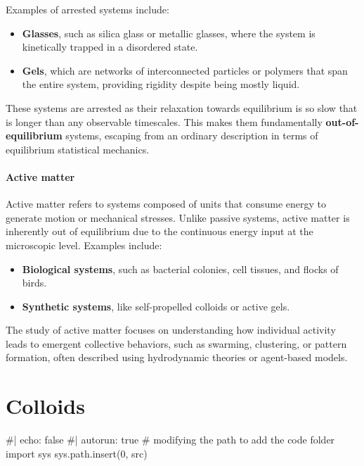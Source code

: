 \documentclass[
  letterpaper,
  enabledeprecatedfontcommands]{report}
\newenvironment{Shaded}{\begin{snugshade}}{\end{snugshade}}
\newcommand{\NormalTok}[1]{\textcolor[rgb]{0.00,0.23,0.31}{#1}}
\providecommand{\tightlist}{%
  \setlength{\itemsep}{0pt}\setlength{\parskip}{0pt}}
\begin{document}
Examples of arrested systems include:

\begin{itemize}
\tightlist
\item
  \textbf{Glasses}, such as silica glass or metallic glasses, where the
  system is kinetically trapped in a disordered state.
\item
  \textbf{Gels}, which are networks of interconnected particles or
  polymers that span the entire system, providing rigidity despite being
  mostly liquid.
\end{itemize}

These systems are arrested as their relaxation towards equilibrium is so
slow that is longer than any observable timescales. This makes them
fundamentally \textbf{out-of-equilibrium} systems, escaping from an
ordinary description in terms of equilibrium statistical mechanics.

\subsubsection*{Active matter}\label{active-matter}

Active matter refers to systems composed of units that consume energy to
generate motion or mechanical stresses. Unlike passive systems, active
matter is inherently out of equilibrium due to the continuous energy
input at the microscopic level. Examples include:

\begin{itemize}
\tightlist
\item
  \textbf{Biological systems}, such as bacterial colonies, cell tissues,
  and flocks of birds.
\item
  \textbf{Synthetic systems}, like self-propelled colloids or active
  gels.
\end{itemize}

The study of active matter focuses on understanding how individual
activity leads to emergent collective behaviors, such as swarming,
clustering, or pattern formation, often described using hydrodynamic
theories or agent-based models.

\chapter{Colloids}\label{colloids-1}

\begin{Shaded}
\begin{Highlighting}[]
\NormalTok{\#| echo: false}
\NormalTok{\#| autorun: true}
\NormalTok{\# modifying the path to add the code folder}
\NormalTok{import sys}
\NormalTok{sys.path.insert(0, \textquotesingle{}src\textquotesingle{})}
\end{Highlighting}
\end{Shaded}
\end{document}
